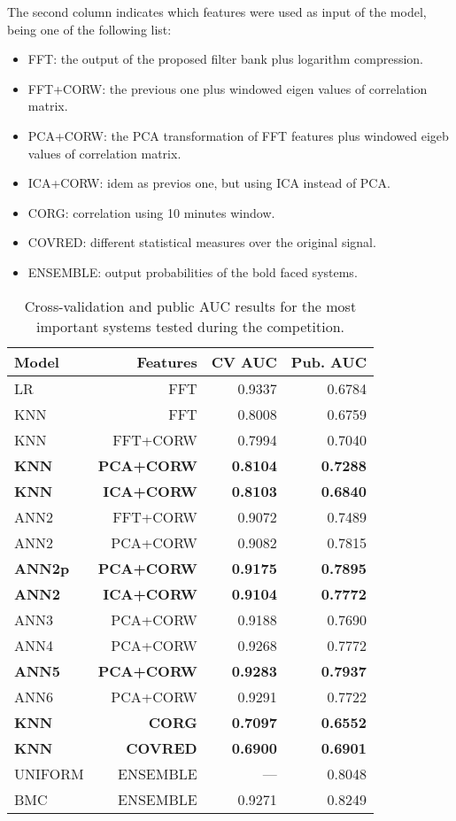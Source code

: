 \documentclass[a4paper,english,twoside]{article}
\begin{document}
The second column indicates which features were used as input of the
model, being one of the following list:

\begin{itemize}
\item
  FFT: the output of the proposed filter bank plus logarithm
  compression.
\item
  FFT+CORW: the previous one plus windowed eigen values of correlation
  matrix.
\item
  PCA+CORW: the PCA transformation of FFT features plus windowed eigeb
  values of correlation matrix.
\item
  ICA+CORW: idem as previos one, but using ICA instead of PCA.
\item
  CORG: correlation using 10 minutes window.
\item
  COVRED: different statistical measures over the original signal.
\item
  ENSEMBLE: output probabilities of the bold faced systems.
\end{itemize}

\begin{table}
  \centering
  \begin{tabular}{|l|r|rr|}
    \hline
    Model & Features & CV AUC & Pub. AUC\\
    \hline
    \hline
    LR & FFT & 0.9337 & 0.6784\\
    \hline
    KNN & FFT & 0.8008 & 0.6759\\
    KNN & FFT+CORW & 0.7994 & 0.7040\\
    \textbf{KNN} & \textbf{PCA+CORW} & \textbf{0.8104} & \textbf{0.7288}\\
    \textbf{KNN} & \textbf{ICA+CORW} & \textbf{0.8103} & \textbf{0.6840}\\
    \hline
    ANN2 & FFT+CORW & 0.9072 & 0.7489\\
    ANN2 & PCA+CORW & 0.9082 & 0.7815\\
    \textbf{ANN2p} & \textbf{PCA+CORW} & \textbf{0.9175} & \textbf{0.7895}\\
    \textbf{ANN2} & \textbf{ICA+CORW} & \textbf{0.9104} & \textbf{0.7772}\\
    ANN3 & PCA+CORW & 0.9188 & 0.7690\\
    ANN4 & PCA+CORW & 0.9268 & 0.7772\\
    \textbf{ANN5} & \textbf{PCA+CORW} & \textbf{0.9283} & \textbf{0.7937}\\
    ANN6 & PCA+CORW & 0.9291 & 0.7722\\
    \hline
    \textbf{KNN} & \textbf{CORG} & \textbf{0.7097} & \textbf{0.6552}\\
    \textbf{KNN} & \textbf{COVRED} & \textbf{0.6900} & \textbf{0.6901}\\
    \hline
    UNIFORM & ENSEMBLE & --- & 0.8048\\
    BMC & ENSEMBLE & 0.9271 & 0.8249\\
    \hline
  \end{tabular}
  \caption{Cross-validation and public AUC results for the most important systems tested during the competition.\label{tab:val}}
\end{table}            
\end{document}
